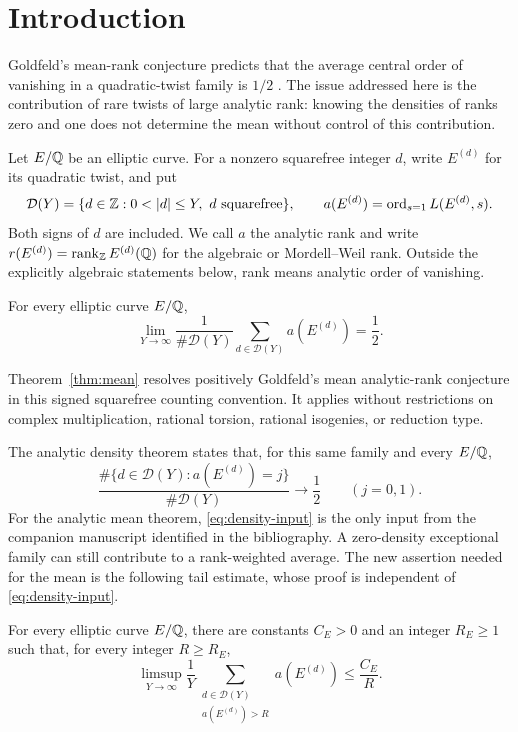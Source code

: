 \section{Introduction}\label{sec:introduction}

Goldfeld's mean-rank conjecture predicts that the average central order
of vanishing in a quadratic-twist family is \(1/2\)
\cite[p.~113, Conjecture~(B)]{Goldfeld1979}.
The issue addressed here is the contribution of rare twists of large
analytic rank: knowing the densities of ranks zero and one does not
determine the mean without control of this contribution.

Let \(E/\mathbb Q\) be an elliptic curve. For a nonzero squarefree integer \(d\),
write \(E^{(d)}\) for its quadratic twist, and put
\[
 \mathcal D(Y)=\{d\in\Z:0<|d|\le Y,\ d\text{ squarefree}\},
 \qquad
 a(E^{(d)})=\ord_{s=1}L(E^{(d)},s).
\]
Both signs of \(d\) are included. We call \(a\) the analytic rank and
write \(r(E^{(d)})=\operatorname{rank}_{\mathbb Z}E^{(d)}(\mathbb Q)\) for the
algebraic or Mordell--Weil rank. Outside the explicitly algebraic
statements below, rank means analytic order of vanishing.

\begin{theorem}\label{thm:mean}
For every elliptic curve \(E/\mathbb Q\),
\[
 \lim_{Y\to\infty}\frac{1}{\#\mathcal D(Y)}
     \sum_{d\in\mathcal D(Y)}a(E^{(d)})=\frac12.
\]
\end{theorem}

Theorem~\ref{thm:mean} resolves positively Goldfeld's mean analytic-rank
conjecture in this signed squarefree counting convention. It applies
without restrictions on complex multiplication, rational torsion,
rational isogenies, or reduction type.

The analytic density theorem
\cite[Theorem~1.2]{OpenAIAnalyticDensityV2}
states that, for this same family and every \(E/\mathbb Q\),
\begin{equation}\label{eq:density-input}
 \frac{\#\{d\in\mathcal D(Y):a(E^{(d)})=j\}}{\#\mathcal D(Y)}
       \longrightarrow\frac12
       \qquad(j=0,1).
\end{equation}
For the analytic mean theorem, \eqref{eq:density-input} is the only input
from the companion manuscript identified in the bibliography.
A zero-density exceptional family can still contribute
to a rank-weighted average. The new assertion needed for the mean is the
following tail estimate, whose proof is independent of
\eqref{eq:density-input}.

\begin{theorem}\label{thm:tail}
For every elliptic curve \(E/\mathbb Q\), there are constants \(C_E>0\) and
an integer \(R_E\ge1\) such that, for every integer \(R\ge R_E\),
\[
 \limsup_{Y\to\infty}\frac1Y
 \sum_{\substack{d\in\mathcal D(Y)\\a(E^{(d)})>R}}a(E^{(d)})
       \le \frac{C_E}{R}.
\]
\end{theorem}

